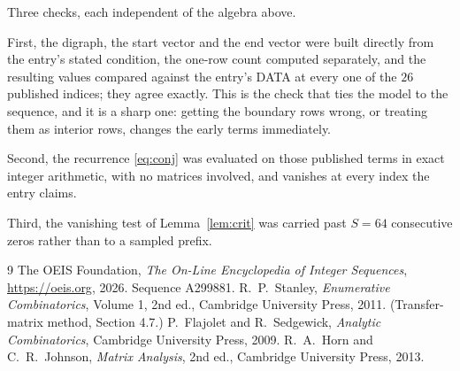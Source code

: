\documentclass[11pt,a4paper]{article}
\theoremstyle{plain}
\theoremstyle{definition}
\begin{document}
Three checks, each independent of the algebra above.

First, the digraph, the start vector and the end vector were built directly from the
entry's stated condition, the one-row count computed separately, and the resulting values
compared against the entry's DATA at every one of the $26$ published indices; they
agree exactly. This is the check that ties the model to the sequence, and it is a sharp one:
getting the boundary rows wrong, or treating them as interior rows, changes the early terms
immediately.

Second, the recurrence \eqref{eq:conj} was evaluated on those published terms in exact
integer arithmetic, with no matrices involved, and vanishes at every index the entry claims.

Third, the vanishing test of Lemma~\ref{lem:crit} was carried past $S=64$ consecutive
zeros rather than to a sampled prefix.

\begin{thebibliography}{9}
 The OEIS Foundation, \emph{The On-Line Encyclopedia of Integer
Sequences}, \url{https://oeis.org}, 2026. Sequence A299881.
 R.~P.~Stanley, \emph{Enumerative Combinatorics}, Volume 1, 2nd ed.,
Cambridge University Press, 2011. (Transfer-matrix method, Section 4.7.)
 P.~Flajolet and R.~Sedgewick, \emph{Analytic Combinatorics}, Cambridge
University Press, 2009.
 R.~A.~Horn and C.~R.~Johnson, \emph{Matrix Analysis}, 2nd ed., Cambridge
University Press, 2013.
\end{thebibliography}
\end{document}
